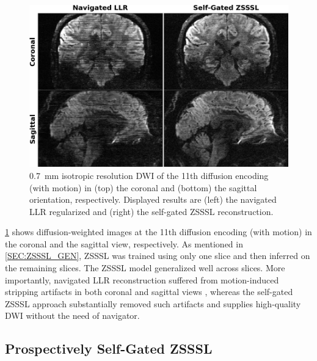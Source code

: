 \documentclass[journal,twoside,web]{ieeecolor}
\begin{document}
	\begin{figure}
		\begin{minipage}[c]{0.75\textwidth}
			\includegraphics[width=\textwidth]{../figures/fig6.png}
		\end{minipage}\hfill
		\begin{minipage}[c]{0.23\textwidth}
			\caption{\SI{0.7}{\milli\meter} isotropic resolution DWI
			of the 11th diffusion encoding (with motion)
			in (top) the coronal and (bottom) the sagittal orientation, respectively.
			Displayed results are (left) the navigated LLR regularized
			and (right) the self-gated ZSSSL reconstruction.}
			\label{FIG:MOTION_RETRO_2}
		\end{minipage}
	\end{figure}

	\cref{FIG:MOTION_RETRO_2} shows diffusion-weighted images
	at the 11th diffusion encoding (with motion)
	in the coronal and the sagittal view, respectively.
	As mentioned in \cref{SEC:ZSSSL_GEN}, ZSSSL was trained using only one slice
	and then inferred on the remaining slices.
	The ZSSSL model generalized well across slices.
	More importantly, navigated LLR reconstruction suffered from motion-induced
	stripping artifacts in both coronal and sagittal views \cite{chang_2021_musium},
	whereas the self-gated ZSSSL approach substantially removed such artifacts
	and supplies high-quality DWI without the need of navigator.


	\subsection{Prospectively Self-Gated ZSSSL}
\end{document}
